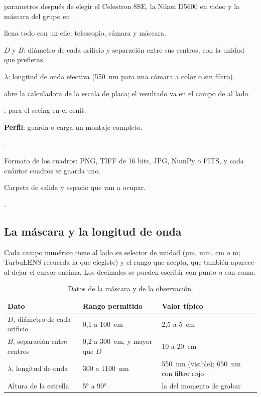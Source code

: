 \begin{capturam}{parametros}{ después de elegir el Celestron 8SE, la Nikon D5600 en video y la máscara del
grupo en .}
\item {} llena todo con un clic: telescopio, cámara y máscara.
\item $D$ y $B$: diámetro de cada orificio y separación entre sus centros, con la unidad que prefieras.
\item $\lambda$: longitud de onda efectiva (550~nm para una cámara a color o sin filtro).
\item {} abre la calculadora de la escala de placa; el resultado va en el campo de al lado.
\item {}: para el seeing en el cenit.
\item \textbf{Perfil}: guarda o carga un montaje completo.
\item {}.
\item Formato de los cuadros: PNG, TIFF de 16 bits, JPG, NumPy o FITS, y cada cuántos cuadros se guarda uno.
\item Carpeta de salida y espacio que van a ocupar.
\item {}.
\end{capturam}

\subsection{La máscara y la longitud de onda}

Cada campo numérico tiene al lado su selector de unidad (µm, mm, cm o m; TurbuLENS recuerda la que elegiste) y el rango
que acepta, que también aparece al dejar el cursor encima. Los decimales se pueden escribir con punto o con coma.

\begin{table}[H]
\centering\small
\begin{tabular}{@{}l l l@{}}
\toprule
Dato & Rango permitido & Valor típico\\
\midrule
$D$, diámetro de cada orificio & 0,1 a 100~cm & 2,5 a 5~cm\\
$B$, separación entre centros & 0,2 a 300~cm, y mayor que $D$ & 10 a 20~cm\\
$\lambda$, longitud de onda & 300 a 1100~nm & 550~nm (visible); 650~nm con filtro rojo\\
Altura de la estrella & 5° a 90° & la del momento de grabar\\
\bottomrule
\end{tabular}
\caption{Datos de la máscara y de la observación.}
\end{table}


